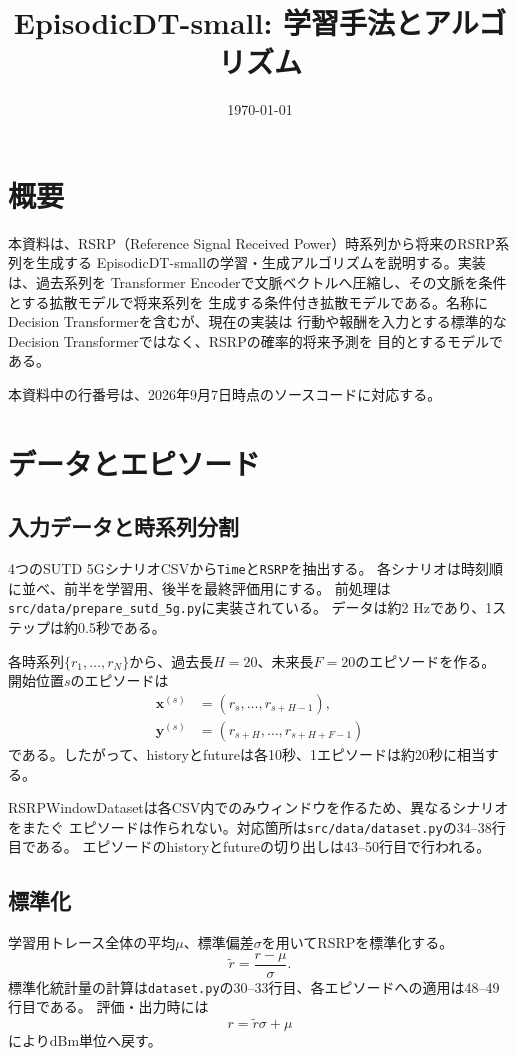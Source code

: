 \documentclass[a4paper,11pt]{bxjsarticle}
\title{EpisodicDT-small: 学習手法とアルゴリズム}
\author{}
\date{\today}
\begin{document}
\maketitle

\section{概要}
本資料は、RSRP（Reference Signal Received Power）時系列から将来のRSRP系列を生成する
EpisodicDT-smallの学習・生成アルゴリズムを説明する。実装は、過去系列を
Transformer Encoderで文脈ベクトルへ圧縮し、その文脈を条件とする拡散モデルで将来系列を
生成する条件付き拡散モデルである。名称にDecision Transformerを含むが、現在の実装は
行動や報酬を入力とする標準的なDecision Transformerではなく、RSRPの確率的将来予測を
目的とするモデルである。

本資料中の行番号は、2026年9月7日時点のソースコードに対応する。

\section{データとエピソード}
\subsection{入力データと時系列分割}
4つのSUTD 5GシナリオCSVから\texttt{Time}と\texttt{RSRP}を抽出する。
各シナリオは時刻順に並べ、前半を学習用、後半を最終評価用にする。
前処理は\texttt{src/data/prepare\_sutd\_5g.py}に実装されている。
データは約2 Hzであり、1ステップは約0.5秒である。

各時系列$\{r_1,\ldots,r_N\}$から、過去長$H=20$、未来長$F=20$のエピソードを作る。
開始位置$s$のエピソードは
\begin{align}
  \mathbf{x}^{(s)} &= (r_s,\ldots,r_{s+H-1}), \\
  \mathbf{y}^{(s)} &= (r_{s+H},\ldots,r_{s+H+F-1})
\end{align}
である。したがって、historyとfutureは各10秒、1エピソードは約20秒に相当する。

RSRPWindowDatasetは各CSV内でのみウィンドウを作るため、異なるシナリオをまたぐ
エピソードは作られない。対応箇所は\texttt{src/data/dataset.py}の34--38行目である。
エピソードのhistoryとfutureの切り出しは43--50行目で行われる。

\subsection{標準化}
学習用トレース全体の平均$\mu$、標準偏差$\sigma$を用いてRSRPを標準化する。
\begin{equation}
  \tilde{r} = \frac{r-\mu}{\sigma}.
\end{equation}
標準化統計量の計算は\texttt{dataset.py}の30--33行目、各エピソードへの適用は48--49行目である。
評価・出力時には
\begin{equation}
  r = \tilde{r}\sigma + \mu
\end{equation}
によりdBm単位へ戻す。
\end{document}
